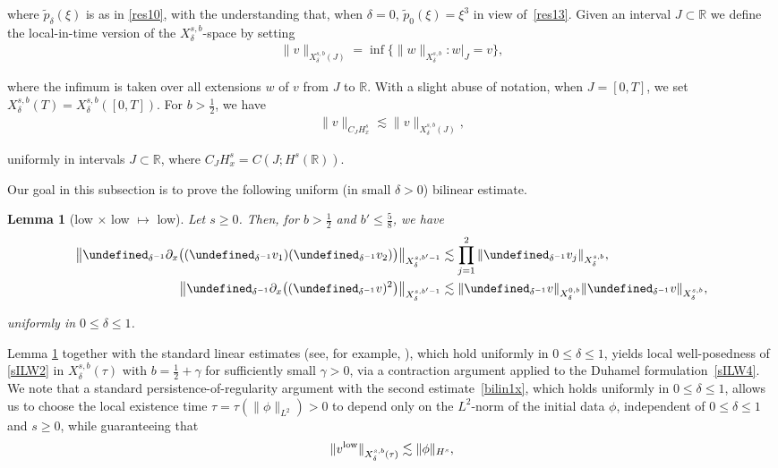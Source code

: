 \documentclass[letterpaper, 11pt,  reqno]{amsart}
\newtheorem{lemma}[theorem]{Lemma}
\newcommand{\1}{\hspace{0.5mm}\textup{I}\hspace{0.5mm}}
\newcommand{\noi}{\noindent}
\newcommand{\R}{\mathbb{R}}
\let\P= \undefined
\newcommand{\P}{\mathbf{P}}
\newcommand{\low}{\textup{low}}
\newcommand{\dl}{\delta}
\newcommand{\g}{\gamma}
\newcommand{\wt}{\widetilde}
\newcommand{\dx}{\partial_x}
\newcommand{\les}{\lesssim}
\numberwithin{equation}{section}
\numberwithin{theorem}{section}
\begin{document}
\noi
where $\wt p_\dl(\xi)$ is as in \eqref{res10}, 
with the understanding that, when $\dl = 0$,  
$\wt p_0(\xi) = \xi^3$ 
in view of~\eqref{res13}.
Given an interval $J \subset\R$
we define the local-in-time version of the $X^{s, b}_\dl$-space
by setting
 \begin{align}
\| v\|_{X^{s,b}_{\dl}(J) }=\inf\big\{\| w\|_{X^{s,b}_{\dl}}: w|_{J}=v\big\}, 
\label{Xsb1b}
\end{align}
     
\noi
where the infimum is taken over all extensions $w$ of $v$
from $J$ to $\R$.
With a slight abuse of notation, 
when $J = [0, T]$, we set 
$X^{s,b}_{\dl}(T) = X^{s,b}_{\dl}([0, T])$.
For $b > \frac 12$, we have 
\begin{align}
\|v\|_{C_JH^s_x}
\les 
\|v\|_{X^{s, b}_{\dl}(J)}, 
 \label{Xsb1a}
\end{align}

\noi
uniformly in 
intervals $J \subset \R$, 
where
$C_{J}H^s_x
= C(J;H^s(\R))$.




Our goal in this subsection is to prove the following uniform  (in small $\dl > 0$) bilinear estimate.


\begin{lemma}
[low $\times$ low $\mapsto$ low]
\label{LEM:bilin1}
Let  $s \ge 0$.
Then, for  $b > \frac 12$ and $b' \le \frac 58 $, we have 
\begin{align}
\big\| \P_{\dl^{-1}}\dx\big( (\P_{ \dl^{-1}}v_1) (\P_{\dl^{-1}}v_2)\big)\big\|_{X^{s, b'-1}_\dl} 
& \les \prod_{j = 1}^2 \| \P_{\dl^{-1}}v_j\|_{X^{s, b}_\dl}, 
\label{bilin1}\\
\big\| \P_{\dl^{-1}}\dx\big( (\P_{ \dl^{-1}}v)^2 \big)\big\|_{X^{s, b'-1}_\dl} 
& \les \| \P_{\dl^{-1}}v\|_{X^{0, b}_\dl}
\| \P_{\dl^{-1}}v\|_{X^{s, b}_\dl} , 
\label{bilin1x}
\end{align}


\noi
uniformly in $0 \le \dl \le1$.

\end{lemma}
	


Lemma \ref{LEM:bilin1}
 together with the standard linear estimates (see, for example,  \cite{TAO}), 
 which hold uniformly in $0 \le  \dl \le 1$, 
yields
local well-posedness of 
\eqref{sILW2} 
in $X^{s,b}_{\dl}(\tau)$ with $b = \frac 12 + \g$
for sufficiently small $\g > 0$, 
via  a contraction argument applied to the Duhamel formulation~\eqref{sILW4}.
We note that a standard 
persistence-of-regularity argument
with the second estimate~\eqref{bilin1x},
which holds uniformly in $0 \le \dl \le 1$,  
allows us to  
choose 
the local existence time
 $\tau  = \tau(\|\phi\|_{L^2})>0$ 
to depend only on the $L^2$-norm of the initial data $\phi$, 
 independent of $0 \le  \dl \le 1$ and $s \ge 0$, 
while guaranteeing that 
\begin{align}\label{bilin1y}
\|v^\low\|_{X^{s,b}_\dl(\tau)}\lesssim \|\phi\|_{H^s},
\end{align}
\end{document}
